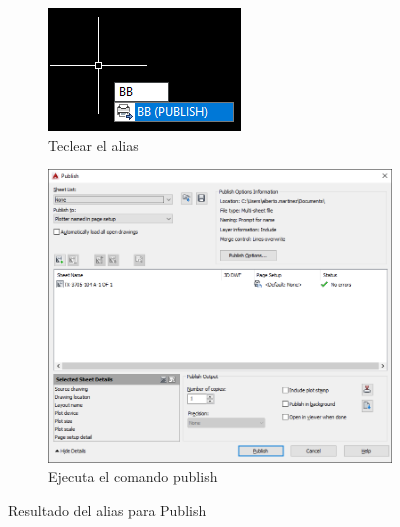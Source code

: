 \documentclass{report}
\begin{document}
\begin{figure}[H]
	\centering
	\begin{subfigure}[b]{0.43\textwidth}
		\includegraphics[width=\textwidth]{Imagenes/autocad_alias_publish_02}
		\caption{Teclear el alias}
		\label{fig:autocadaliaspublish02}
	\end{subfigure}
	\begin{subfigure}[b]{0.45\textwidth}
		\includegraphics[width=\textwidth]{Imagenes/autocad_alias_publish_03}
		\caption{Ejecuta el comando publish}
		\label{fig:autocadaliaspublish03}
	\end{subfigure}
	\caption{Resultado del alias para Publish}
\end{figure}
\end{document}
